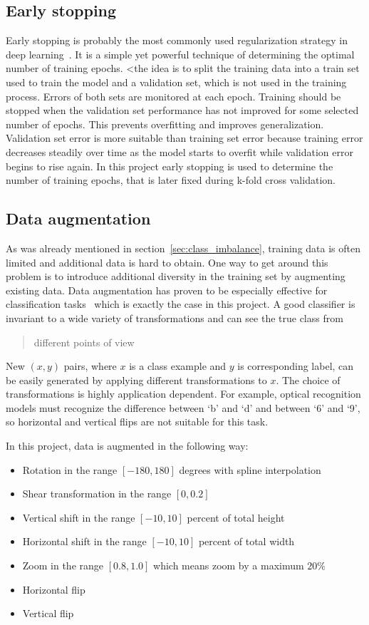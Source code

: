 \documentclass[a4paper, 11pt, table]{article}
\begin{document}
\subsection{Early stopping}
Early stopping is probably the most commonly used regularization strategy in deep learning~\cite{dl_book}. It is a simple yet powerful technique of determining the optimal number of training epochs. <the idea is to split the training data into a train set used to train the model and a validation set, which is not used in the training process. Errors of both sets are monitored at each epoch. Training should be stopped when the validation set performance has not improved for some selected number of epochs. This prevents overfitting and improves generalization. Validation set error is more suitable than training set error because training error decreases steadily over time as the model starts to overfit while validation error begins to rise again. 
In this project early stopping is used to determine the number of training epochs, that is later fixed during k-fold cross validation.

\subsection{Data augmentation}
\label{sec:data_augmentation}
As was already mentioned in section~\ref{sec:class_imbalance}, training data is often limited and additional data is hard to obtain. One way to get around this problem is to introduce additional diversity in the training set by augmenting existing data. Data augmentation has proven to be especially effective for classification tasks~\cite{dl_book} which is exactly the case in this project. 
A good classifier is invariant to a wide variety of transformations and can see the true class from \blockquote{different points of view}. New $(x, y)$ pairs, where $x$ is a class example and $y$ is corresponding label, can be easily generated by applying different transformations to $x$. The choice of transformations is highly application dependent. For example, optical recognition models must recognize the difference between `b' and `d' and between `6' and `9', so horizontal and vertical flips are not suitable for this task. 
 
In this project, data is augmented in the following way:

\begin{itemize}
\item Rotation in the range $[-180, 180]$ degrees with spline interpolation
\item Shear transformation in the range $[0, 0.2]$
\item Vertical shift in the range $[-10, 10]$ percent of total height
\item Horizontal shift in the range $[-10, 10]$ percent of total width
\item Zoom in the range $[0.8, 1.0]$ which means zoom by a maximum $20\%$
\item Horizontal flip
\item Vertical flip
\end{itemize}
\end{document}
